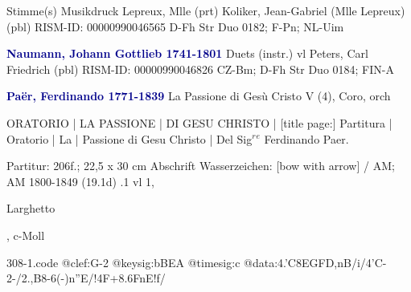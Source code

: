 \documentclass[twocolumn]{book}
\begin{document}
\newline \textcolor{darkblue}{}  Stimme(s)
\newline Musikdruck
\newline Lepreux, Mlle  (prt)
\newline Koliker, Jean-Gabriel (Mlle Lepreux)  (pbl)
\newline RISM-ID: 00000990046565
\newline D-Fh  Str Duo 0182; F-Pn; NL-Uim
\newline \par \vspace{7pt} \textcolor{darkblue}{\textbf{Naumann, Johann Gottlieb  1741-1801}}
\newline Duets (instr.)
 vl
\newline Peters, Carl Friedrich  (pbl)
\newline RISM-ID: 00000990046826
\newline CZ-Bm; D-Fh  Str Duo 0184; FIN-A
\newline \par \vspace{7pt} \textcolor{darkblue}{\textbf{Paër, Ferdinando  1771-1839}}
\newline La Passione di Gesù Cristo
\newline V (4), Coro, orch
\newline \begin{itshape} ORATORIO | LA PASSIONE | DI GESU CHRISTO | [title page:] Partitura | Oratorio | La | Passione di Gesu Christo | Del Sig$^r$$^e$ Ferdinando Paer.\end{itshape} 
\newline \textcolor{darkblue}{}  Partitur: 206f.; 22,5 x 30 cm
\newline Abschrift
\newline Wasserzeichen: [bow with arrow] / AM; AM  1800-1849 (19.1d)
.1  vl 1, \begin{itshape}Larghetto\end{itshape}, c-Moll  
\begin{filecontents*}{308-1.code}
@clef:G-2
@keysig:bBEA
@timesig:c
@data:4.'C8E{GFD,nB}/i/4'C-2-/2.,B8-6(-)n''E/!4F+{8.6FnE}!f/
\end{filecontents*}
\newline
\end{document}
